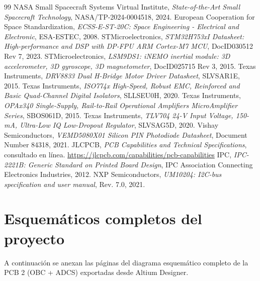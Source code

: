 \documentclass[11pt,a4paper]{article}
\begin{document}
\begin{thebibliography}{99}
 NASA Small Spacecraft Systems Virtual Institute, \textit{State-of-the-Art Small Spacecraft Technology}, NASA/TP-2024-0004518, 2024.
 European Cooperation for Space Standardization, \textit{ECSS-E-ST-20C: Space Engineering - Electrical and Electronic}, ESA-ESTEC, 2008.
 STMicroelectronics, \textit{STM32H753xI Datasheet: High-performance and DSP with DP-FPU ARM Cortex-M7 MCU}, DocID030512 Rev 7, 2023.
 STMicroelectronics, \textit{LSM9DS1: iNEMO inertial module: 3D accelerometer, 3D gyroscope, 3D magnetometer}, DocID025715 Rev 3, 2015.
 Texas Instruments, \textit{DRV8833 Dual H-Bridge Motor Driver Datasheet}, SLVSAR1E, 2015.
 Texas Instruments, \textit{ISO774x High-Speed, Robust EMC, Reinforced and Basic Quad-Channel Digital Isolators}, SLLSEU0H, 2020.
 Texas Instruments, \textit{OPAx340 Single-Supply, Rail-to-Rail Operational Amplifiers MicroAmplifier Series}, SBOS061D, 2015.
 Texas Instruments, \textit{TLV704 24-V Input Voltage, 150-mA, Ultra-Low IQ Low-Dropout Regulator}, SLVSAG5D, 2020.
 Vishay Semiconductors, \textit{VEMD5080X01 Silicon PIN Photodiode Datasheet}, Document Number 84318, 2021.
 JLCPCB, \textit{PCB Capabilities and Technical Specifications}, consultado en línea. \url{https://jlcpcb.com/capabilities/pcb-capabilities}
 IPC, \textit{IPC-2221B: Generic Standard on Printed Board Design}, IPC Association Connecting Electronics Industries, 2012.
 NXP Semiconductors, \textit{UM10204: I2C-bus specification and user manual}, Rev. 7.0, 2021.
\end{thebibliography}

\appendix
\section{Esquemáticos completos del proyecto}
A continuación se anexan las páginas del diagrama esquemático completo de la PCB 2 (OBC + ADCS) exportadas desde Altium Designer.


\end{document}
